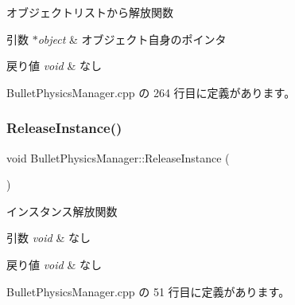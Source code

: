 オブジェクトリストから解放関数 


\begin{DoxyParams}{引数}
{\em $\ast$object} & オブジェクト自身のポインタ \\
\hline
\end{DoxyParams}

\begin{DoxyRetVals}{戻り値}
{\em void} & なし \\
\hline
\end{DoxyRetVals}


 Bullet\+Physics\+Manager.\+cpp の 264 行目に定義があります。

\mbox{\label{class_bullet_physics_manager_a10b55190182029ac95365e4f52dd1758}} 
\subsubsection{\texorpdfstring{Release\+Instance()}{ReleaseInstance()}}
{\footnotesize\ttfamily void Bullet\+Physics\+Manager\+::\+Release\+Instance (\begin{DoxyParamCaption}{ }\end{DoxyParamCaption})\hspace{0.3cm}{\ttfamily [static]}}



インスタンス解放関数 


\begin{DoxyParams}{引数}
{\em void} & なし \\
\hline
\end{DoxyParams}

\begin{DoxyRetVals}{戻り値}
{\em void} & なし \\
\hline
\end{DoxyRetVals}


 Bullet\+Physics\+Manager.\+cpp の 51 行目に定義があります。

\mbox{\label{class_bullet_physics_manager_a7f022644ccafde7e87497f90b1efec07}} 
